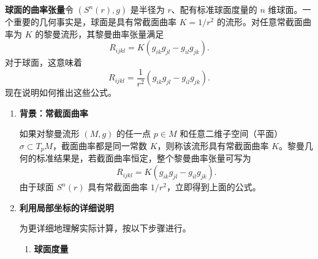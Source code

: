 \textbf{球面的曲率张量}\quad 令 $(S^n(r),g)$ 是半径为 $r$、配有标准球面度量的 $n$ 维球面。一个重要的几何事实是，球面是具有常截面曲率 $K=1/r^2$ 的流形。对任意常截面曲率为 $K$ 的黎曼流形，其黎曼曲率张量满足
\begin{equation*}
  R_{ijkl}=K(g_{ik}g_{jl}-g_{il}g_{jk}).
  \tag{5B21}\label{eq:5B21}
\end{equation*}
对于球面，这意味着
\begin{equation*}
  R_{ijkl}=\frac1{r^2}(g_{ik}g_{jl}-g_{il}g_{jk}).
  \tag{5B22}\label{eq:5B22}
\end{equation*}
现在说明如何推出这些公式。
\begin{enumerate}
  \item \textbf{背景：常截面曲率}

  如果对黎曼流形 $(M,g)$ 的任一点 $p\in M$ 和任意二维子空间（平面）$\sigma\subset T_pM$，截面曲率都是同一常数 $K$，则称该流形具有常截面曲率 $K$。黎曼几何的标准结果是，若截面曲率恒定，整个黎曼曲率张量可写为
  \[
    R_{ijkl}=K(g_{ik}g_{jl}-g_{il}g_{jk}).
  \]
  由于球面 $S^n(r)$ 具有常截面曲率 $1/r^2$，立即得到上面的公式。
  \item \textbf{利用局部坐标的详细说明}

  为更详细地理解实际计算，按以下步骤进行。
  \begin{enumerate}[label=\alph*.]
    \item \textbf{球面度量}


\end{enumerate}
\end{enumerate}
